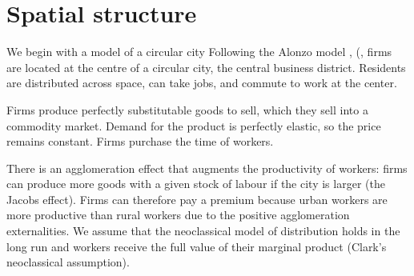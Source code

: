 \section{Spatial structure}


We begin with a model of a circular city %
Following the \gls{Alonzo model} \cite{alonzoTheoryUrbanLand1960}, (\cite{alonsoLocationLandUse1964}, firms are located at the centre of a circular city, the central business district. Residents are distributed across space, can take jobs, and commute to work at the center. 

Firms produce perfectly \gls{substitutable} goods to sell, %
which they sell into a commodity market. Demand for the \gls{product} is \gls{perfectly elastic}, so the price remains constant. Firms purchase the time of workers. %

There is an agglomeration effect that augments the productivity of workers: firms can produce more goods with a given stock of labour if the city is larger (the Jacobs effect). Firms can therefore pay a premium because urban workers are more productive than rural workers due to the positive agglomeration externalities. We assume that the neoclassical model of distribution holds in the long run and workers receive the full value of their marginal product (Clark's neoclassical assumption).

